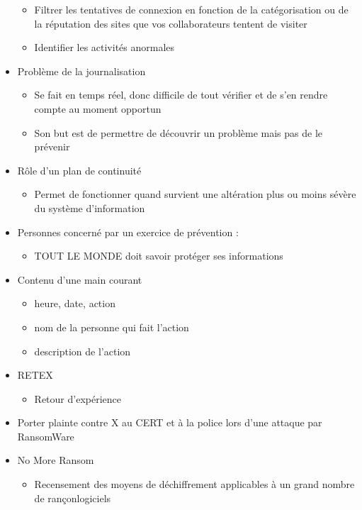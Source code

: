 \documentclass[a4paper]{article}
\begin{document}
\begin{itemize}[label=\textbullet, font=\Large]
    \begin{itemize}[label=, font=\scriptsize]
      \item Filtrer les tentatives de connexion en fonction de la catégorisation ou de la réputation des sites que vos collaborateurs tentent de visiter
      \item Identifier les activités anormales
    \end{itemize}
    \item Problème de la journalisation
    \begin{itemize}[label=, font=\scriptsize]
      \item Se fait en temps réel, donc difficile de tout vérifier et de s'en rendre compte au moment opportun
      \item Son but est de permettre de découvrir un problème mais pas de le prévenir
    \end{itemize}
    \item Rôle d'un plan de continuité
    \begin{itemize}[label=, font=\scriptsize]
      \item Permet de fonctionner quand survient une altération plus ou moins sévère du système d'information
    \end{itemize}
    \item Personnes concerné par un exercice de prévention :
    \begin{itemize}[label=, font=\scriptsize]
      \item TOUT LE MONDE doit savoir protéger ses informations
    \end{itemize}
    \item Contenu d'une main courant
    \begin{itemize}[label=, font=\scriptsize]
      \item heure, date, action
      \item nom de la personne qui fait l'action
      \item description de l'action
    \end{itemize}
    \item RETEX
    \begin{itemize}[label=, font=\scriptsize]
      \item Retour d'expérience
    \end{itemize}
    \item Porter plainte contre X au CERT et à la police lors d'une attaque par RansomWare
    \item No More Ransom
    \begin{itemize}[label=, font=\scriptsize]
      \item Recensement des moyens de déchiffrement applicables à un grand nombre de rançonlogiciels
    \end{itemize}
  \end{itemize}
\end{document}

